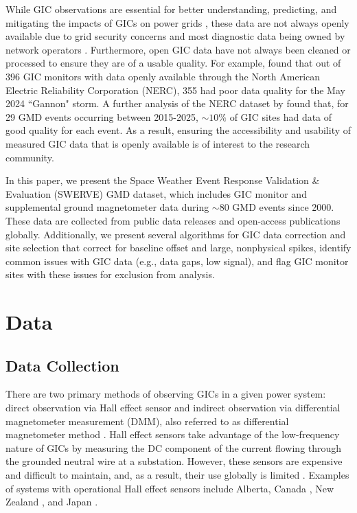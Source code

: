 \documentclass[draft]{agujournal2019}
\begin{document}
While GIC observations are essential for better understanding, predicting, and mitigating the impacts of GICs on power grids \cite{MacManus2025}, these data are not always openly available due to grid security concerns and most diagnostic data being owned by network operators \cite{Hapgood2016}. Furthermore, open GIC data have not always been cleaned or processed to ensure they are of a usable quality.
For example,   found that out of 396 GIC monitors with data openly available through the North American Electric Reliability Corporation (NERC), 355 had poor data quality for the May 2024 ``Gannon" storm. A further analysis of the NERC dataset by  found that, for 29 GMD events occurring between 2015-2025, $\sim10\%$ of GIC sites had data of good quality for each event. As a result, ensuring the accessibility and usability of measured GIC data that is openly available is of interest to the research community.

In this paper, we present the Space Weather Event Response Validation \& Evaluation (SWERVE) GMD dataset, which includes GIC monitor and supplemental ground magnetometer data during $\sim80$ GMD events since 2000. These data are collected from public data releases and open-access publications globally. Additionally, we present several algorithms for GIC data correction and site selection that correct for baseline offset and large, nonphysical spikes, identify common issues with GIC data (e.g., data gaps, low signal), and flag GIC monitor sites with these issues for exclusion from analysis. 

\section{Data}

\subsection{Data Collection}
There are two primary methods of observing GICs in a given power system: direct observation via Hall effect sensor and indirect observation via differential magnetometer measurement (DMM), also referred to as differential magnetometer method \cite{Parry2024}. Hall effect sensors take advantage of the low-frequency nature of GICs by measuring the DC component of the current flowing through the grounded neutral wire at a substation.
However, these sensors are expensive and difficult to maintain, and, as a result, their use globally is limited \cite{Hubert2020}. Examples of systems with operational Hall effect sensors include Alberta, Canada \cite{Parry2024}, New Zealand \cite{MacManus2025}, and Japan \cite{Watari2025}.
\end{document}
